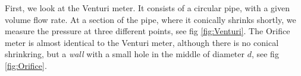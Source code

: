First, we look at the Venturi meter. It consists of a circular pipe, with a given volume flow rate. At a section of the pipe, where it conically shrinks shortly, we measure the pressure at three different points, see fig \ref{fig:Venturi}. The Orifice meter is almost identical to the Venturi meter, although there is no conical shrinkring, but a \textit{wall} with a small hole in the middle of diameter $d$, see fig \ref{fig:Orifice}.
